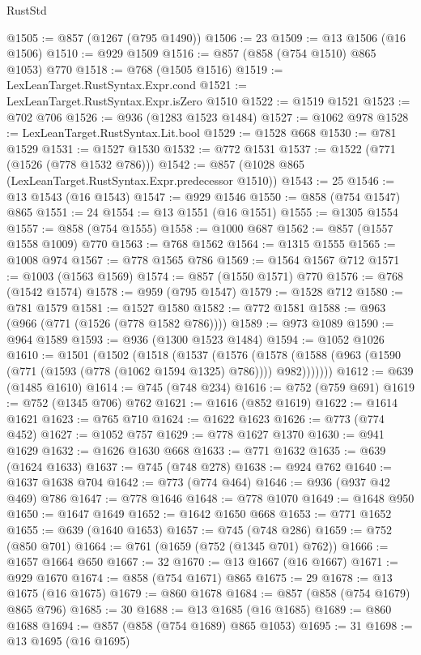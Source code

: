 \begin{lexlean}{RustStd}
\begin{coremodule}
@1505 := @857 (@1267 (@795 @1490))
@1506 := 23
@1509 := @13 @1506 (@16 @1506)
@1510 := @929 @1509
@1516 := @857 (@858 (@754 @1510) @865 @1053) @770
@1518 := @768 (@1505 @1516)
@1519 := LexLeanTarget.RustSyntax.Expr.cond
@1521 := LexLeanTarget.RustSyntax.Expr.isZero @1510
@1522 := @1519 @1521
@1523 := @702 @706
@1526 := @936 (@1283 @1523 @1484)
@1527 := @1062 @978
@1528 := LexLeanTarget.RustSyntax.Lit.bool
@1529 := @1528 @668
@1530 := @781 @1529
@1531 := @1527 @1530
@1532 := @772 @1531
@1537 := @1522 (@771 (@1526 (@778 @1532 @786)))
@1542 := @857 (@1028 @865 (LexLeanTarget.RustSyntax.Expr.predecessor @1510))
@1543 := 25
@1546 := @13 @1543 (@16 @1543)
@1547 := @929 @1546
@1550 := @858 (@754 @1547) @865
@1551 := 24
@1554 := @13 @1551 (@16 @1551)
@1555 := @1305 @1554
@1557 := @858 (@754 @1555)
@1558 := @1000 @687
@1562 := @857 (@1557 @1558 @1009) @770
@1563 := @768 @1562
@1564 := @1315 @1555
@1565 := @1008 @974
@1567 := @778 @1565 @786
@1569 := @1564 @1567 @712
@1571 := @1003 (@1563 @1569)
@1574 := @857 (@1550 @1571) @770
@1576 := @768 (@1542 @1574)
@1578 := @959 (@795 @1547)
@1579 := @1528 @712
@1580 := @781 @1579
@1581 := @1527 @1580
@1582 := @772 @1581
@1588 := @963 (@966 (@771 (@1526 (@778 @1582 @786))))
@1589 := @973 @1089
@1590 := @964 @1589
@1593 := @936 (@1300 @1523 @1484)
@1594 := @1052 @1026
@1610 := @1501
    (@1502
      (@1518
        (@1537
          (@1576
            (@1578 (@1588 (@963 (@1590 (@771 (@1593 (@778 (@1062 @1594 @1325) @786)))) @982)))))))
@1612 := @639 (@1485 @1610)
@1614 := @745 (@748 @234)
@1616 := @752 (@759 @691)
@1619 := @752 (@1345 @706) @762
@1621 := @1616 (@852 @1619)
@1622 := @1614 @1621
@1623 := @765 @710
@1624 := @1622 @1623
@1626 := @773 (@774 @452)
@1627 := @1052 @757
@1629 := @778 @1627 @1370
@1630 := @941 @1629
@1632 := @1626 @1630 @668
@1633 := @771 @1632
@1635 := @639 (@1624 @1633)
@1637 := @745 (@748 @278)
@1638 := @924 @762
@1640 := @1637 @1638 @704
@1642 := @773 (@774 @464)
@1646 := @936 (@937 @42 @469) @786
@1647 := @778 @1646
@1648 := @778 @1070
@1649 := @1648 @950
@1650 := @1647 @1649
@1652 := @1642 @1650 @668
@1653 := @771 @1652
@1655 := @639 (@1640 @1653)
@1657 := @745 (@748 @286)
@1659 := @752 (@850 @701)
@1664 := @761 (@1659 (@752 (@1345 @701) @762))
@1666 := @1657 @1664 @650
@1667 := 32
@1670 := @13 @1667 (@16 @1667)
@1671 := @929 @1670
@1674 := @858 (@754 @1671) @865
@1675 := 29
@1678 := @13 @1675 (@16 @1675)
@1679 := @860 @1678
@1684 := @857 (@858 (@754 @1679) @865 @796)
@1685 := 30
@1688 := @13 @1685 (@16 @1685)
@1689 := @860 @1688
@1694 := @857 (@858 (@754 @1689) @865 @1053)
@1695 := 31
@1698 := @13 @1695 (@16 @1695)

\end{coremodule}
\end{lexlean}
